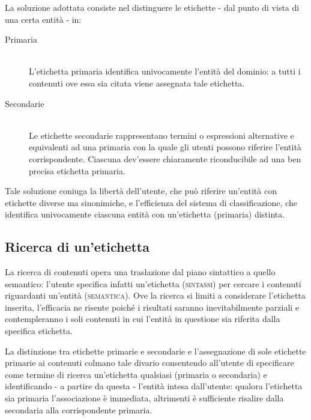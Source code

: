 \documentclass[10pt,a4paper,headinclude,footinclude,hidelinks]{scrreprt} %
\begin{document}
	La soluzione adottata consiste nel distinguere le etichette - dal punto di vista di una certa entità - in:
	\begin{description}
	\item[Primaria] \hfill \\
	L'etichetta primaria identifica univocamente l'entità del dominio: a tutti i contenuti ove essa sia citata viene assegnata tale etichetta.
	\item[Secondarie] \hfill \\
	Le etichette secondarie rappresentano termini o espressioni alternative e equivalenti ad una primaria con la quale gli utenti possono riferire l'entità corrispondente. Ciascuna dev'essere chiaramente riconducibile ad una ben precisa etichetta primaria.
	\end{description}


	Tale soluzione coniuga la libertà dell'utente, che può riferire un'entità con etichette diverse ma sinonimiche, e l'efficienza del sistema di classificazione, che identifica univocamente ciascuna entità con un'etichetta (primaria) distinta.

	\subsection{Ricerca di un'etichetta}
	La ricerca di contenuti opera una traslazione dal piano sintattico a quello semantico: l'utente specifica infatti un'etichetta (\textsc{sintassi}) per cercare i contenuti riguardanti un'entità (\textsc{semantica}). Ove la ricerca si limiti a considerare l'etichetta inserita, l'efficacia ne risente poiché i risultati saranno inevitabilmente parziali e contempleranno i soli contenuti in cui l'entità in questione sia riferita dalla specifica etichetta.
	
	La distinzione tra etichette primarie e secondarie e l'assegnazione di sole etichette primarie ai contenuti colmano tale divario consentendo all'utente di specificare come termine di ricerca un'etichetta qualsiasi (primaria o secondaria) e identificando - a partire da questa - l'entità intesa dall'utente: qualora l'etichetta sia primaria l'associazione è immediata, altrimenti è sufficiente risalire dalla secondaria alla corrispondente primaria.
\end{document}
